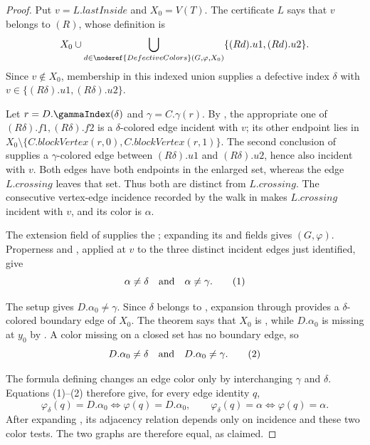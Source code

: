 \begin{proof}
Put $v=L.\mathit{lastInside}$ and $X_0=V(T)$.  The certificate $L$ says
that $v$ belongs to $(R)$, whose
definition is
\[
 X_0\cup\bigcup_{d\in\noderef{DefectiveColors}(G,\varphi,X_0)}
       \{(Rd).u1,(Rd).u2\}.
\]
Since $v\notin X_0$, membership in this indexed union supplies a defective
index $\delta$ with $v\in\{(R\delta).u1,(R\delta).u2\}$.

Let $r=D.\gammaIndex(\delta)$ and $\gamma=C.\gamma(r)$.  By
, the appropriate one of
$(R\delta).f1,(R\delta).f2$ is a $\delta$-colored edge incident with $v$;
its other endpoint lies in
$X_0\setminus\{C.\mathit{blockVertex}(r,0),
C.\mathit{blockVertex}(r,1)\}$.  The second conclusion of
 supplies a $\gamma$-colored
edge between $(R\delta).u1$ and $(R\delta).u2$, hence also incident with
$v$.  Both edges have both endpoints in the enlarged set, whereas the
edge $L.\mathit{crossing}$ leaves that set.  Thus both are distinct from
$L.\mathit{crossing}$.  The consecutive vertex-edge incidence recorded
by the walk in  makes
$L.\mathit{crossing}$ incident with $v$, and its color is $\alpha$.

The extension field of  supplies the
; expanding its
 and  fields gives
$(G,\varphi)$.  Properness and
, applied at $v$ to the three distinct incident
edges just identified, give
\[
 \alpha\ne\delta\quad\hbox{and}\quad\alpha\ne\gamma.       \tag{1}
\]

The setup  gives
$D.\alpha_0\ne\gamma$.  Since $\delta$ belongs to
, expansion through 
provides a $\delta$-colored boundary edge of $X_0$.  The theorem
 says that $X_0$ is
, while $D.\alpha_0$ is missing at $y_0$
by .  A color missing on a closed set has
no boundary edge, so
\[
 D.\alpha_0\ne\delta\quad\hbox{and}\quad
 D.\alpha_0\ne\gamma.                                    \tag{2}
\]

The formula defining  changes an edge
color only by interchanging $\gamma$ and $\delta$.  Equations (1)--(2)
therefore give, for every edge identity $q$,
\[
 \varphi_\delta(q)=D.\alpha_0\iff\varphi(q)=D.\alpha_0,
 \qquad
 \varphi_\delta(q)=\alpha\iff\varphi(q)=\alpha.
\]
After expanding , its adjacency relation
depends only on incidence and these two color tests.  The two graphs are
therefore equal, as claimed.
\end{proof}
